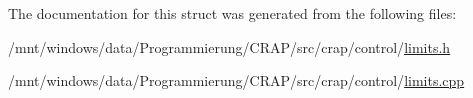 The documentation for this struct was generated from the following files\-:\begin{DoxyCompactItemize}
\item 
/mnt/windows/data/\-Programmierung/\-C\-R\-A\-P/src/crap/control/\hyperlink{limits_8h}{limits.\-h}\item 
/mnt/windows/data/\-Programmierung/\-C\-R\-A\-P/src/crap/control/\hyperlink{limits_8cpp}{limits.\-cpp}\end{DoxyCompactItemize}
